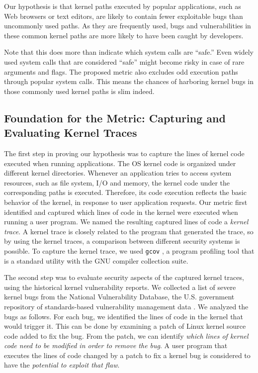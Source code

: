 Our hypothesis is that kernel paths executed by popular applications, such as Web browsers or text editors,
are likely to contain fewer exploitable bugs than uncommonly used paths.
As they are frequently used,
bugs and vulnerabilities in these common kernel paths are more likely to have
been caught by developers.

Note that this does more than indicate which system calls are ``safe.''
Even widely used system calls that are considered ``safe'' might become risky in case of rare arguments and flags.
The proposed metric also excludes odd execution paths through popular system calls. This means
the chances of harboring kernel bugs in those commonly used kernel paths is slim indeed.


\subsection{Foundation for the Metric: Capturing and Evaluating Kernel Traces}

The first step in proving our hypothesis was to capture the lines of kernel
code executed
when running applications. The OS kernel code is organized under different
kernel directories.
Whenever an application tries to access system resources, such as file
system, I/O and memory, the kernel code under the corresponding paths is executed. Therefore,
its code execution reflects the basic behavior of the kernel, in response
to user application requests.
Our metric first identified and captured which lines of code in the kernel
were executed
when running a user program. We named the resulting captured lines of
code a \textit{kernel trace}.
A kernel trace is closely related to the program that generated the trace, so
by using the kernel traces, a comparison between different
security systems is possible.
To capture the kernel trace, we used \texttt{gcov} \cite{gcov}, a program profiling
tool that is a standard utility with the GNU compiler collection
suite.


The second step was to evaluate security aspects of the captured kernel traces,%
using the historical kernel vulnerability reports. We collected a list of
severe kernel bugs from
the National Vulnerability Database, the U.S. government repository of
standards-based vulnerability management data \cite{NVD}. We analyzed the bugs as
follows. For each bug, we identified the lines of code
in the kernel that would trigger it. This can be done by examining
a patch of Linux kernel source code added to fix the bug. From the patch,
we can identify \textit{which lines of kernel code need to be modified in order to
remove the bug}.
A user program that executes the lines of code changed by a patch to fix a
kernel bug is considered to have the \textit{potential to exploit that flaw}.

